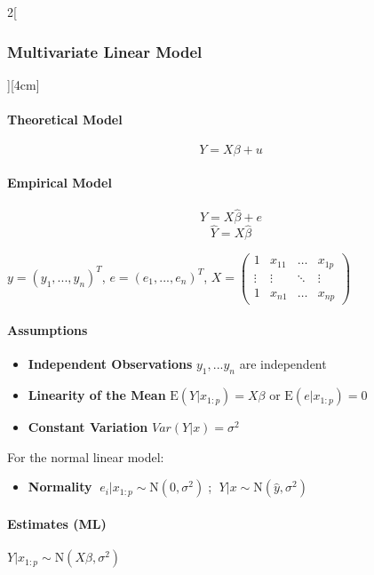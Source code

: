 \documentclass[8pt]{extarticle}
\begin{document}
\begin{multicols}{2}[\subsubsection{Multivariate Linear Model}][4cm]

\paragraph{Theoretical Model}

$$Y = X\beta + u$$

\paragraph{Empirical Model}

$$Y = X\hat{\beta} + e$$
$$\hat{Y} = X\hat{\beta} $$

\noindent $y = (y_1, ... , y_n)^T$, $e = (e_1, ... , e_n)^T$, $X = \begin{pmatrix}
1 & x_{11}& \ldots&x_{1p} \\
 \vdots & \vdots&\ddots & \vdots\\
1 & x_{n1} &\ldots&x_{np}
\end{pmatrix}$

\paragraph{Assumptions}

\begin{itemize}
\item \textbf{Independent Observations} $y_1,...y_n$ are independent
\item \textbf{Linearity of the Mean} $\mathrm{E}(Y|x_{1:p})= X\beta$ or $\mathrm{E}(e|x_{1:p})= 0$ 
\item \textbf{Constant Variation} $Var(Y|x) = \sigma^2$
\end{itemize}
For the normal linear model:
\begin{itemize}
\item \textbf{Normality} $\;e_i|x_{1:p} \sim \mathrm{N}(0,\sigma^2)\;$; $\;Y|x \sim \mathrm{N}(\hat{y},\sigma^2)\;$
\end{itemize}

\paragraph{Estimates (ML)} $Y|x_{1:p} \sim \mathrm{N}(X\beta, \sigma^2)$


\end{multicols}
\end{document}
